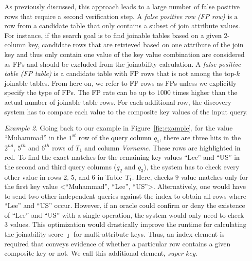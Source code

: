 As previously discussed, this approach leads to a large number of false positive rows that require a second verification step.
A \textit{false positive row (FP row)} is a row from a candidate table that only contains a subset of join attribute values. For instance, if the search goal is to find joinable tables based on a given 2-column key, candidate rows that are retrieved based on one attribute of the join key and thus only contain one value of the key value combination are considered as FPs and should be excluded from the joinability calculation.
A \textit{false positive table (FP table)} is a candidate table with FP rows that is not among the top-$k$ joinable tables. From here on, we refer to FP rows as FPs unless we explicitly specify the type of FPs.
The FP rate can be up to $1000$ times higher than the actual number of joinable table rows. For each additional row, the discovery system has to compare each value to the composite key values of the input query.

\textit{Example 2.} Going back to our example in Figure~\ref{fig:example}, for the value ``Muhammad'' in the $1^{st}$ row of the query column $q_1$, there are three hits in the $2^{nd}$, $5^{th}$ and $6^{th}$ rows of $T_1$ and column \textit{Vorname}. These rows are highlighted in red. To find the exact matches for the remaining key values ``Lee'' and ``US'' in the second and third query columns ($q_2$ and $q_3$), the system has to check every other value in rows $2$, $5$, and $6$ in Table~$T_1$. Here, \system checks $9$ value matches only for the first key value <``Muhammad'', ``Lee'', ``US''>.
Alternatively, one would have to send two other independent queries against the index to obtain all rows where ``Lee'' and ``US'' occur. 
However, if an oracle could confirm or deny the existence of ``Lee'' and ``US'' with a single operation, the system would only need to check $3$ values.
This optimization would drastically improve the runtime for calculating the joinability score $\jmath$ for multi-attribute keys.
Thus, an index element is required that conveys evidence of whether a particular row contains a given composite key or not. We call this additional element, \textit{super key}. 
